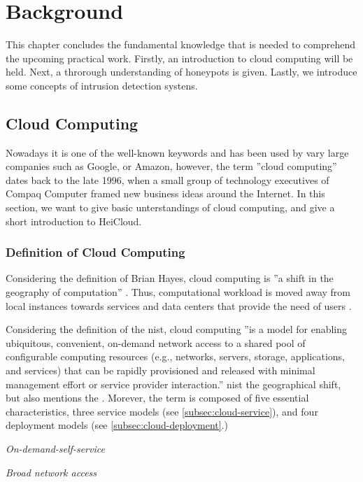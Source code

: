 \chapter{Background}

This chapter concludes the fundamental knowledge that is needed to comprehend the upcoming practical work. Firstly, an introduction to cloud computing will be held. Next, a throrough understanding of honeypots is given. Lastly, we introduce some concepts of intrusion detection systens.

\section{Cloud Computing}

Nowadays it is one of the well-known keywords and has been used by vary large companies such as Google, or Amazon, however, the term ''cloud computing'' dates back to the late 1996, when a small group of technology executives of Compaq Computer framed new business ideas around the Internet.\cite{regalado2020} In this section, we want to give basic unterstandings of cloud computing, and give a short introduction to HeiCloud.

\subsection{Definition of Cloud Computing}

Considering the definition of Brian Hayes, cloud computing is ''a shift in the geography of computation'' \cite{hayes2008}. Thus, computational workload is moved away from local instances towards services and data centers that provide the need of users \cite{Armbrust2010}.

Considering the definition of the \acrfull{nist}, cloud computing ''is a model for enabling ubiquitous, convenient, on-demand network access to a shared pool of configurable computing resources (e.g., networks, servers, storage, applications, and services) that can be rapidly provisioned and released with minimal management effort or service provider interaction.'' \acrshort{nist} the geographical shift, but also mentions the . Morever, the term is composed of five essential characteristics, three service models (see \ref{subsec:cloud-service}), and four deployment models (see \ref{subsec:cloud-deployment}.)

\textit{On-demand-self-service}

\textit{Broad network access}

